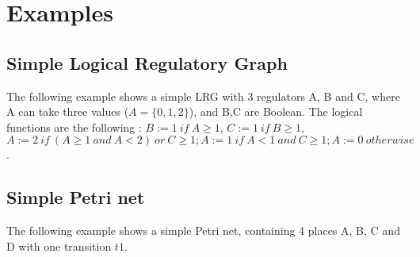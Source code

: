 
\section{Examples}
\label{examples}

\subsection*{Simple Logical Regulatory Graph} %
\label{sub:lrg}
\LRG The following example shows a simple LRG with 3 regulators A, B and C, where A can take three values ($A=\{0,1,2\}$), and B,C are Boolean. The logical functions are the following : $B := 1\ if\ A \ge 1$, $C := 1\ if\ B \ge 1$, $A := 2\ if\ (A \ge 1\ and\ A < 2)\ or\ C \ge 1 ; A := 1\ if\ A < 1\ and\ C \ge 1 ; A := 0\  otherwise$.



\bigskip
\subsection*{Simple Petri net} %
\label{sub:ex_pn}
\PN The following example shows a simple Petri net, containing 4 places A, B, C and D with one transition $t1$.




